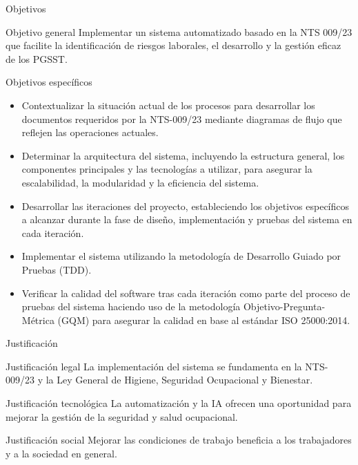 \documentclass[spanish]{beamer} %
\begin{document}
\begin{frame}[allowframebreaks]{Objetivos}
  \begin{block}{Objetivo general}
    Implementar un sistema automatizado basado en la NTS 009/23 que facilite la identificación de riesgos laborales, el desarrollo y la gestión eficaz de los PGSST.
  \end{block}
  \begin{block}{Objetivos específicos}
  \begin{itemize}
    \item Contextualizar la situación actual de los procesos para desarrollar los documentos requeridos por la NTS-009/23 mediante diagramas de flujo que reflejen las operaciones actuales.
    \item Determinar la arquitectura del sistema, incluyendo la estructura general, los componentes principales y las tecnologías a utilizar, para asegurar la escalabilidad, la modularidad y la eficiencia del sistema.
  \end{itemize}
  \end{block}

  \begin{itemize}
    \item Desarrollar las iteraciones del proyecto, estableciendo los objetivos específicos a alcanzar durante la fase de diseño, implementación y pruebas del sistema en cada iteración.
    \item Implementar el sistema utilizando la metodología de Desarrollo Guiado por Pruebas (TDD).
    \item Verificar la calidad del software tras cada iteración como parte del proceso de pruebas del sistema haciendo uso de la metodología Objetivo-Pregunta-Métrica (GQM) para asegurar la calidad en base al estándar ISO 25000:2014.
  \end{itemize}

\end{frame}

\begin{frame}{Justificación}
  \begin{block}{Justificación legal}
  La implementación del sistema se fundamenta en la NTS-009/23 y la Ley General de Higiene, Seguridad Ocupacional y Bienestar.
  \end{block}
  \begin{block}{Justificación tecnológica}
  La automatización y la IA ofrecen una oportunidad para mejorar la gestión de la seguridad y salud ocupacional.
  \end{block}
  \begin{block}{Justificación social}
  Mejorar las condiciones de trabajo beneficia a los trabajadores y a la sociedad en general.
  \end{block}
\end{frame}
\end{document}

